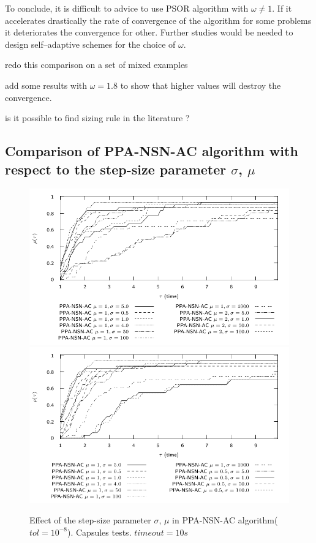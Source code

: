To conclude, it is difficult to advice to use PSOR algorithm with $\omega\neq 1$. If it accelerates drastically the rate of convergence of the algorithm for some problems it deteriorates the convergence for other. Further studies would be needed to design self--adaptive schemes for the choice of $\omega$.

\begin{ndrva}
  \item redo this comparison on a set of mixed examples
  \item add some results with $\omega =1.8$ to show that higher values will destroy the convergence.
  \item is it possible to find sizing rule in the literature ?
\end{ndrva}



\subsection{Comparison of PPA-NSN-AC algorithm with respect to  the step-size parameter $\sigma$, $\mu$}

\begin{figure}
  \centering
  \includegraphics[width=\widthfigure\textwidth]{../figure/profile-Capsules-reduced-PPA-NSN-AC-1_10-time.pdf}
  \includegraphics[width=\widthfigure\textwidth]{../figure/profile-Capsules-reduced-PPA-NSN-AC-1_10-time-bis.pdf}
   \caption{Effect of the step-size parameter $\sigma$, $\mu$ in PPA-NSN-AC algorithm( $tol = 10^{-8}$). Capsules tests. $timeout=10s$}
  \label{fig:profile-Capsules-reduced-PPA-NSN-AC-1_10-time}
\end{figure}

